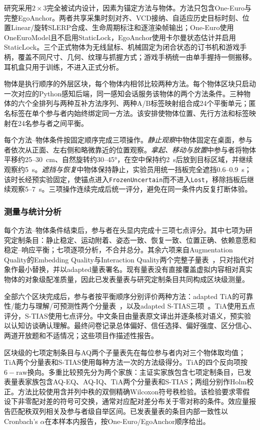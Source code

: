 \documentclass[review]{vgtc}
\begin{document}
研究采用$2 \times 3$完全被试内设计，因素为锚定方法与物体。方法只包含One-Euro与完整EgoAnchor。两者共享采集时刻对齐、VCD接纳、自适应历史目标时刻、位置Linear/旋转SLERP合成、生命周期标注和逐渲染帧输出；One-Euro使用OneEuroModel且不启用StaticLock，EgoAnchor使用卡尔曼状态估计并启用StaticLock。三个正式物体为无线鼠标、机械固定为闭合状态的订书机和游戏手柄，覆盖不同尺寸、几何、纹理与抓握方式；游戏手柄统一由单手握持一侧搬移。耳机盒只用于训练，不进入正式分析。

物体是执行顺序的外层区块，每个物体内相邻比较两种方法。每个物体区块只启动一次对应的Python感知后端，同一感知会话服务该物体的两个方法条件。三种物体的六个全排列与两种互补方法序列、两种A/B标签映射组合成24个平衡单元；匿名标签在单个参与者内始终绑定同一方法。该安排使物体位置、先行方法和标签映射在24名参与者之间平衡。

每个方法--物体条件按固定顺序完成三项操作。\emph{静止观察}中物体固定在桌面，参与者依次从正面、左右侧和略微靠近的位置观察。\emph{拿起、移动与放置}中参与者将物体平移约25--30~cm、自然旋转约30--45°，在空中保持约2~s后放到目标区域，并继续观察约5~s。\emph{遮挡与恢复}中物体保持静止，实验员用统一挡板完全遮挡0.6--0.9~s；该时长经预实验固定，使锚点进入\texttt{FrozenUncertain}而不进入\texttt{Lost}，移除挡板后继续观察5--7~s。三项操作连续完成后统一评分，避免在同一条件内反复打断体验。

\subsubsection{测量与统计分析}

每个方法--物体条件结束后，参与者在头显内完成十三项七点评分。其中七项为研究定制条目：静止稳定、运动附着、姿态一致、恢复一致、位置正确、依赖意愿和稳定--响应平衡；七项逐项分析，不合并总分。其余六项来自Augmentation Quality的Embedding Quality与Interaction Quality两个完整子量表~\cite{schein2025aq}，只对指代对象作最小替换，并以adapted量表署名。现有量表没有直接覆盖虚拟内容相对真实物体的对象级配准质量，因此已发表量表与研究定制条目共同构成区块级测量。

全部六个区块完成后，参与者按平衡顺序分别评价两种方法：adapted TiA的可靠性/能力与理解/可预测性两个分量表~\cite{koerber2019tia}，以及adapted S-TIAS三项~\cite{mcgrath2025stias}。TiA使用五点评分，S-TIAS使用七点评分。中文条目由量表原文译出并逐条核对语义，预实验以认知访谈确认理解。最终问卷记录总体偏好、信任选择、偏好强度、区分信心、两道开放题和不适情况；这些项目作描述性报告。

区块级的七项定制条目与AQ两个子量表先在每位参与者内对三个物体取均值；TiA两个分量表和S-TIAS使用每种方法一次的方法级得分。TiA的四个反向项按$6-\mathrm{raw}$换向。多重比较预先分为两个家族：主证实家族包含七项定制条目，已发表量表家族包含AQ-EQ、AQ-IQ、TiA两个分量表和S-TIAS；两组分别作Holm校正。方法比较使用含并列中秩的双侧精确Wilcoxon符号秩检验。该检验要求零假设下非零配对差的符号可交换，通常对应配对差分布关于零对称的条件。效应量报告匹配秩双列相关及参与者级自举区间。已发表量表的条目内部一致性以Cronbach's $\alpha$在本样本内报告，按One-Euro/EgoAnchor顺序给出。
\end{document}
